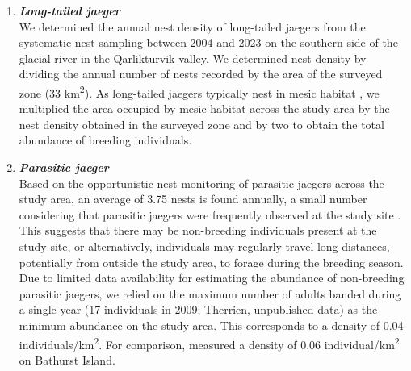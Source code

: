 \documentclass[a4paper,twoside,12pt]{article}
\begin{document}
\begin{enumerate}[label=\alph*.]
                \item[] \textit{\textbf{Long-tailed jaeger}}\\
                We determined the annual nest density of long-tailed jaegers from the systematic nest sampling between 2004 and 2023 on the southern side of the glacial river in the Qarlikturvik valley. We determined nest density by dividing the annual number of nests recorded by the area of the surveyed zone (33 km\textsuperscript{2}). As long-tailed jaegers typically nest in mesic habitat \citep{andersson1971}, we multiplied the area occupied by mesic habitat across the study area by the nest density obtained in the surveyed zone and by two to obtain the total abundance of breeding individuals.
                
                \item[] \textit{\textbf{Parasitic jaeger}}\\
                Based on the opportunistic nest monitoring of parasitic jaegers across the study area, an average of 3.75 nests is found annually, a small number considering that parasitic jaegers were frequently observed at the study site \citep{gauthier2024a}. This suggests that there may be non-breeding individuals present at the study site, or alternatively, individuals may regularly travel long distances, potentially from outside the study area, to forage during the breeding season. Due to limited data availability for estimating the abundance of non-breeding parasitic jaegers, we relied on the maximum number of adults banded during a single year (17 individuals in 2009; Therrien, unpublished data) as the minimum abundance on the study area. This corresponds to a density of 0.04 individuals/km\textsuperscript{2}. For comparison, \citet{taylor1974} measured a density of 0.06 individual/km\textsuperscript{2} on Bathurst Island.
                

\end{enumerate}
\end{document}
